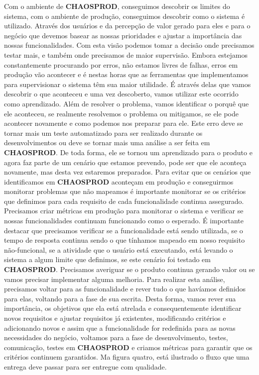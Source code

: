       Com o ambiente de \textbf{CHAOSPROD}, conseguimos descobrir os limites do
      sistema, com o ambiente de produção, conseguimos descobrir como o sistema é
      utilizado. Através dos usuários e da percepção de valor gerado para eles
      e para o negócio que devemos basear as nossas prioridades e ajustar a
      importância das nossas funcionalidades. Com esta visão podemos tomar a decisão
      onde precisamos testar mais, e também onde precisamos de maior supervisão.
      Embora estejamos constantemente procurando por erros, não estamos livres de
      falhas, erros em produção vão acontecer e é nestas horas que as ferramentas
      que implementamos para supervisionar o sistema têm sua maior utilidade. É
      através delas que vamos descobrir o que aconteceu e uma vez descoberto, vamos
      utilizar este ocorrido como aprendizado. Além de resolver o problema, vamos
      identificar o porquê que ele aconteceu, se realmente resolvemos o problema ou
      mitigamos, se ele pode acontecer novamente e como podemos nos preparar para
      ele. Este erro deve se tornar mais um teste automatizado para ser realizado
      durante os desenvolvimentos ou deve se tornar mais uma análise a ser feita em
      \textbf{CHAOSPROD}. De toda forma, ele se tornou um aprendizado para o produto
      e agora faz parte de um cenário que estamos prevendo, pode ser que ele
      aconteça novamente, mas desta vez estaremos preparados. \newline
      Para evitar que os cenários que identificamos em \textbf{CHAOSPROD} aconteçam
      em produção e conseguirmos monitorar problemas que não mapeamos é importante
      monitorar se os critérios que definimos para cada requisito de cada funcionalidade
      continua assegurado. Precisamos criar métricas em produção para monitorar
      o sistema e verificar se nossas funcionalidades continuam funcionando como o
      esperado. É importante destacar que precisamos verificar se a funcionalidade
      está sendo utilizada, se o tempo de resposta continua sendo o que tínhamos
      mapeado em nosso requisito não-funcional, se a atividade que o usuário está
      executando, está levando o sistema a algum limite que definimos, se este
      cenário foi testado em \textbf{CHAOSPROD}. Precisamos averiguar se o
      produto continua gerando valor ou se vamos precisar implementar alguma
      melhoria. Para realizar esta análise, precisamos voltar para as funcionalidade
      e rever tudo o que havíamos definidos para elas, voltando para a fase de
      sua escrita. Desta forma, vamos rever sua importância, os objetivos que ela
      está atrelada e consequentemente identificar novos requisitos e ajustar
      requisitos já existentes, modificando critérios e adicionando novos e
      assim que a funcionalidade for redefinida para as novas necessidades do
      negócio, voltamos para a fase de desenvolvimento, testes, comunicação,
      testes em \textbf{CHAOSPROD} e criamos métricas para garantir que
      os critérios continuem garantidos. Ma figura quatro, está ilustrado o fluxo
      que uma entrega deve passar para ser entregue com qualidade.

